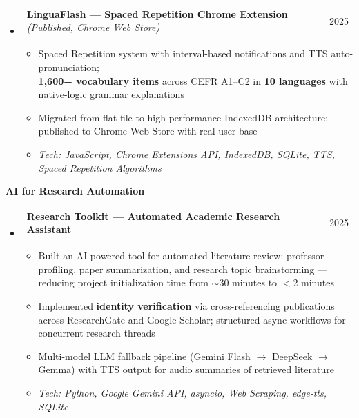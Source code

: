 \documentclass[11pt,a4paper]{article}
\makeatletter
\newcommand{\subspace}{\vspace{0.5em}}
\newcommand{\cvsubsection}[1]{
    \subspace
    \noindent\textcolor{primary}{\large \textbf{#1}}
    \par\vspace{0.3em}
}
\newcommand{\headerrow}[2]{
    \begin{tabular*}{\linewidth}{l@{\extracolsep{\fill}}r}
    #1 & \textcolor{primary}{#2} \\
    \end{tabular*}
}
\makeatother
\begin{document}
\begin{itemize}[leftmargin=1em, label={}]

    \item
    \headerrow{\textbf{LinguaFlash — Spaced Repetition Chrome Extension} \emph{(Published, Chrome Web Store)}}{2025}
    \begin{itemize}[leftmargin=1.5em, label=$\bullet$, nosep]
        \item Spaced Repetition system with interval-based notifications and TTS auto-pronunciation; \\\textbf{1,600+ vocabulary items} across CEFR A1--C2 in \textbf{10 languages} with native-logic grammar explanations
        \item Migrated from flat-file to high-performance IndexedDB architecture; published to Chrome Web Store with real user base
        \item \emph{Tech: JavaScript, Chrome Extensions API, IndexedDB, SQLite, TTS, Spaced Repetition Algorithms}
    \end{itemize}

\end{itemize}

\cvsubsection{AI for Research Automation}

\begin{itemize}[leftmargin=1em, label={}]

    \item
    \headerrow{\textbf{Research Toolkit — Automated Academic Research Assistant}}{2025}
    \begin{itemize}[leftmargin=1.5em, label=$\bullet$, nosep]
        \item Built an AI-powered tool for automated literature review: professor profiling, paper summarization, and research topic brainstorming — reducing project initialization time from $\sim$30 minutes to $<$2 minutes
        \item Implemented \textbf{identity verification} via cross-referencing publications across ResearchGate and Google Scholar; structured async workflows for concurrent research threads
        \item Multi-model LLM fallback pipeline (Gemini Flash $\to$ DeepSeek $\to$ Gemma) with TTS output for audio summaries of retrieved literature
        \item \emph{Tech: Python, Google Gemini API, asyncio, Web Scraping, edge-tts, SQLite}
    \end{itemize}

\end{itemize}
\end{document}
